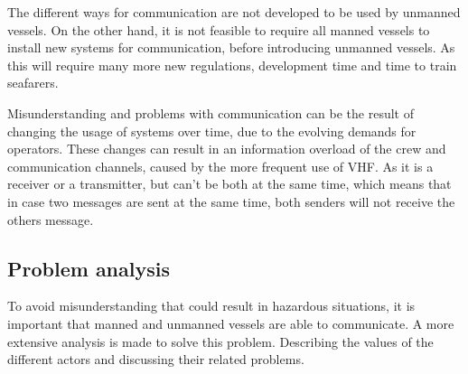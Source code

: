 The different ways for communication are not developed to be used by unmanned vessels. On the other hand, it is not feasible to require all manned vessels to install new systems for communication, before introducing unmanned vessels. As this will require many more new regulations, development time and time to train seafarers.

Misunderstanding and problems with communication can be the result of changing the usage of systems over time, due to the evolving demands for operators. These changes can result in an information overload of the crew and communication channels, caused by the more frequent use of \ac{VHF}. As it is a receiver or a transmitter, but can't be both at the same time, which means that in case two messages are sent at the same time, both senders will not receive the others message.

\subsection{Problem analysis}
To avoid misunderstanding that could result in hazardous situations, it is important that manned and unmanned vessels are able to communicate. A more extensive analysis is made to solve this problem. 
Describing the values of the different actors and discussing their related problems.

